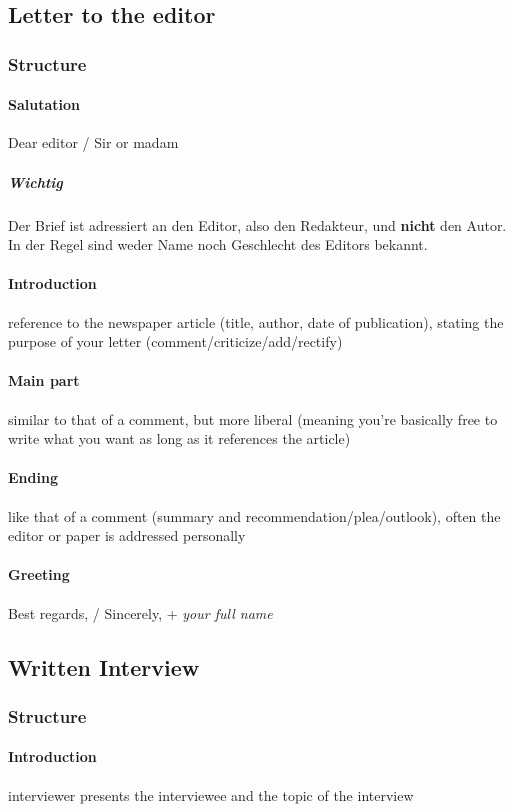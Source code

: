 \documentclass{article}
\begin{document}
	\subsection{Letter to the editor}
	\subsubsection{Structure}
	\paragraph{Salutation}
	Dear editor / Sir or madam
	\subparagraph{\textbf{Wichtig}}
	Der Brief ist adressiert an den Editor, also den Redakteur, und \textbf{nicht} den Autor. In der Regel sind weder Name noch Geschlecht des Editors bekannt.

	\paragraph{Introduction}
	reference to the newspaper article (title, author, date of publication), stating the purpose of your letter (comment/criticize/add/rectify)

	\paragraph{Main part}
	similar to that of a comment, but more liberal (meaning you’re basically free to write what you want as long as it references the article)

	\paragraph{Ending}
	like that of a comment (summary and recommendation/plea/outlook), often the editor or paper is addressed personally

	\paragraph{Greeting}
	Best regards, / Sincerely, + \textit{your full name}

	\subsection{Written Interview}
	\subsubsection{Structure}
	\paragraph{Introduction}
	interviewer presents the interviewee and the topic of the interview
\end{document}
